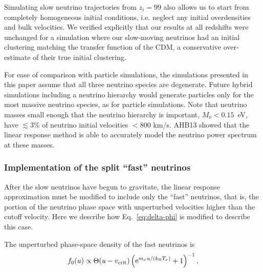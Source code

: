 \documentclass[useAMS, usenatbib]{mnras}
\newcommand{\rme}{\textrm{e}}
\begin{document}
Simulating slow neutrino trajectories from $z_i = 99$ also allows us to start from completely homogeneous initial conditions, i.e. neglect any initial overdensities and bulk velocities. We verified explicitly that our results at all redshifts were unchanged for a simulation where our slow-moving neutrinos had an initial clustering matching the transfer function of the CDM, a conservative over-estimate of their true initial clustering.

For ease of comparison with particle simulations, the simulations presented in this paper assume that all three neutrino species are degenerate. Future hybrid simulations including a neutrino hierarchy would generate particles only for the most massive neutrino species, as for particle simulations. Note that neutrino masses small enough that the neutrino hierarchy is important, $M_\nu < 0.15$~eV, have $\lesssim 3$\% of neutrino initial velocities $< 800$ km/s. AHB13 showed that the linear response method is able to accurately model the neutrino power spectrum at these masses.

\subsubsection{Implementation of the split ``fast'' neutrinos}

After the slow neutrinos have begun to gravitate, the linear response approximation must be modified to include only the ``fast'' neutrinos, that is, the portion of the neutrino phase space with unperturbed velocities higher than the cutoff velocity. Here we describe how Eq.~\ref{eq:delta-phi} is modified to describe this case.

The unperturbed phase-space density of the fast neutrinos is
\begin{equation}
f_0(u) \propto \Theta(u - v_{\rm crit}) \left(\rme^{m_\nu u/ \left(k_\mathrm{B} T_\nu\right)} + 1 \right)^{-1},
\end{equation}
\end{document}
